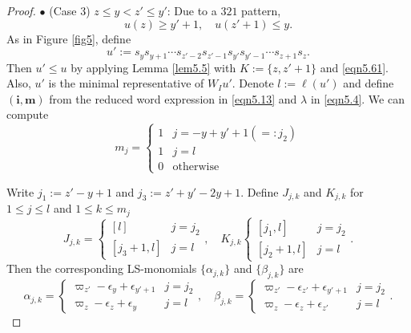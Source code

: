 \documentclass[12pt]{amsart}
\theoremstyle{definition}
\theoremstyle{remark}
\begin{document}
\begin{proof}
$\bullet$ (Case 3) $z \leq y  < z' \leq y'$: Due to a $321$ pattern,
\begin{equation}\label{eqn5.61}
u(z) \geq y'+1, \quad u(z'+1)\leq y.
\end{equation}
As in Figure \ref{fig5}, define
\begin{equation}\label{eqn5.13}
u':=s_y s_{y+1} \cdots s_{z'-2} s_{z'-1} s_{y'}s_{y'-1} \cdots s_{z+1}s_z.
\end{equation}
Then $u' \leq u$ by applying Lemma \ref{lem5.5} with $K:=\{z,z'+1 \}$ and \eqref{eqn5.61}. Also, $u'$ is the minimal representative of $W_Iu'$. Denote $l:= \ell (u')$ and define $(\mathbf{i}, \mathbf{m})$ from the reduced word expression in \eqref{eqn5.13} and $\lambda$ in \eqref{eqn5.4}. We can compute
\begin{equation}\label{eqn5.14}
m_j = 
\begin{cases}
1 & j = -y+y'+1 (=:j_2) \\
1 & j = l \\
0 & \text{otherwise}
\end{cases}
\end{equation}

Write $j_1:= z'-y+1$ and $j_3:=z'+y'-2y+1$. Define $J_{j,k}$ and $K_{j,k}$ for $1\leq j \leq l$ and $1 \leq k \leq m_j$
\begin{equation}\label{eqn5.15}
J_{j,k} = 
\begin{cases}
[l] & j=j_2 \\
[j_3+1,l] & j = l
\end{cases}
, \quad K_{j,k}
\begin{cases}
[j_1,l] & j =j_2 \\
[j_2+1,l] & j =l
\end{cases}
.
\end{equation}
Then the corresponding LS-monomials $\{\alpha_{j,k}\}$ and $\{\beta_{j,k}\}$ are
\begin{equation}\label{eqn5.16}
\alpha_{j,k} = 
\begin{cases}
\varpi_{z'} - \epsilon_{y}+\epsilon_{y'+1} & j = j_2 \\
\varpi_z-\epsilon_z + \epsilon_y & j=l 
\end{cases}
, \quad \beta_{j,k}=
\begin{cases}
\varpi_{z'}-\epsilon_{z'}+\epsilon_{y'+1} & j=j_2 \\
\varpi_{z}-\epsilon_z + \epsilon_{z'} & j=l
\end{cases}
.
\end{equation}


\end{proof}
\end{document}
